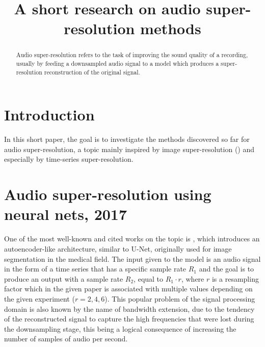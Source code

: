 \documentclass[conference]{IEEEtran}
\begin{document}
\title{A short research on audio super-resolution methods \\
}

\author{
}

\maketitle

\begin{abstract}
Audio super-resolution refers to the task of improving the sound quality of a recording, usually by feeding a downsampled audio signal to a model which produces a super-resolution reconstruction of the original signal.
\end{abstract}

\section{Introduction}
	In this short paper, the goal is to investigate the methods discovered so far for audio super-resolution, a topic mainly inspired by image super-resolution (\textcite{ledig2017photorealistic}) and especially by time-series super-resolution. 
\\

\section{Audio super-resolution using neural nets, 2017}
	One of the most well-known and cited works on the topic is \textcite{kuleshov2017audio}, which introduces an autoencoder-like architecture, similar to U-Net, originally used for image segmentation in the medical field. The input given to the model is an audio signal in the form of a time series that has a specific sample rate \(R_1\) and the goal is to produce an output with a sample rate \(R_2\), equal to \(R_{1} \cdot r\), where \(r\) is a resampling factor which in the given paper is associated with multiple values depending on the given experiment (\(r=2,4,6\)). This popular problem of the signal processing domain is also known by the name of bandwidth extension, due to the tendency of the reconstructed signal to capture the high frequencies that were lost during the downsampling stage, this being a logical consequence of increasing the number of samples of audio per second. 
\end{document}
